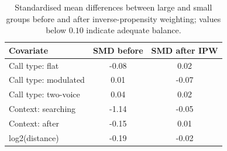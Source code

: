 \begin{table}[!ht]
\centering
\caption{Standardised mean differences between large and small groups before and after inverse-propensity weighting; values below $0.10$ indicate adequate balance.}
\label{tab:p6smd}
\small
\begin{tabular}{lcc}
\toprule
Covariate & SMD before & SMD after IPW \\
\midrule
Call type: flat & -0.08 & 0.02 \\
Call type: modulated & 0.01 & -0.07 \\
Call type: two-voice & 0.04 & 0.02 \\
Context: searching & -1.14 & -0.05 \\
Context: after & -0.15 & 0.01 \\
log2(distance) & -0.19 & -0.02 \\
\bottomrule
\end{tabular}
\end{table}